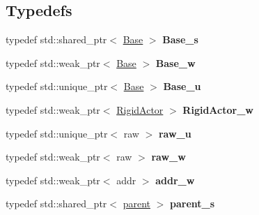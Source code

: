 \subsection*{\-Typedefs}
{\bf }\par
\begin{DoxyCompactItemize}
\item 
\hypertarget{namespaceNeb_1_1Actor_a8f702ef70e4e45d7cb06e9e4e7382e85}{typedef std\-::shared\-\_\-ptr$<$ \hyperlink{classNeb_1_1Actor_1_1Base}{\-Base} $>$ {\bfseries \-Base\-\_\-s}}\label{namespaceNeb_1_1Actor_a8f702ef70e4e45d7cb06e9e4e7382e85}

\item 
\hypertarget{namespaceNeb_1_1Actor_afaf94cd97cc0a89949bc901866541de6}{typedef std\-::weak\-\_\-ptr$<$ \hyperlink{classNeb_1_1Actor_1_1Base}{\-Base} $>$ {\bfseries \-Base\-\_\-w}}\label{namespaceNeb_1_1Actor_afaf94cd97cc0a89949bc901866541de6}

\item 
\hypertarget{namespaceNeb_1_1Actor_a312611dc04f46dfc82e4e1b21cdb4c6d}{typedef std\-::unique\-\_\-ptr$<$ \hyperlink{classNeb_1_1Actor_1_1Base}{\-Base} $>$ {\bfseries \-Base\-\_\-u}}\label{namespaceNeb_1_1Actor_a312611dc04f46dfc82e4e1b21cdb4c6d}

\item 
\hypertarget{namespaceNeb_1_1Actor_a27ac1010e9f25392bd560238135e1c88}{typedef std\-::weak\-\_\-ptr$<$ \hyperlink{classNeb_1_1Actor_1_1RigidActor}{\-Rigid\-Actor} $>$ {\bfseries \-Rigid\-Actor\-\_\-w}}\label{namespaceNeb_1_1Actor_a27ac1010e9f25392bd560238135e1c88}

\item 
\hypertarget{namespaceNeb_1_1Actor_a6baeefe45a0e40b0452ccd9140789b57}{typedef std\-::unique\-\_\-ptr$<$ raw $>$ {\bfseries raw\-\_\-u}}\label{namespaceNeb_1_1Actor_a6baeefe45a0e40b0452ccd9140789b57}

\item 
\hypertarget{namespaceNeb_1_1Actor_ab8eb759983f5d9abe3a98a6a3c59d3d8}{typedef std\-::weak\-\_\-ptr$<$ raw $>$ {\bfseries raw\-\_\-w}}\label{namespaceNeb_1_1Actor_ab8eb759983f5d9abe3a98a6a3c59d3d8}

\item 
\hypertarget{namespaceNeb_1_1Actor_abafd07cad9368d537433770d1b1a2375}{typedef std\-::weak\-\_\-ptr$<$ addr $>$ {\bfseries addr\-\_\-w}}\label{namespaceNeb_1_1Actor_abafd07cad9368d537433770d1b1a2375}

\item 
\hypertarget{namespaceNeb_1_1Actor_a9bfef369ac37059e07a011785701dddd}{typedef std\-::shared\-\_\-ptr$<$ \hyperlink{classNeb_1_1Actor_1_1parent}{parent} $>$ {\bfseries parent\-\_\-s}}\label{namespaceNeb_1_1Actor_a9bfef369ac37059e07a011785701dddd}


\end{DoxyCompactItemize}
